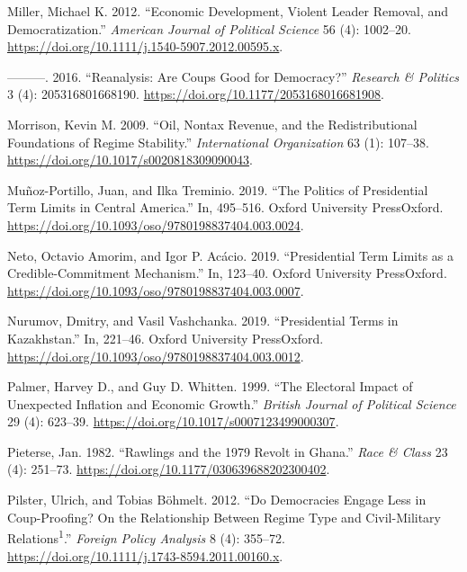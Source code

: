 \documentclass[
  12pt,
]{report}
\newlength{\cslhangindent}
\newenvironment{CSLReferences}[2] %
 {\begin{list}{}{%
  \setlength{\itemindent}{0pt}
  \setlength{\leftmargin}{0pt}
  \setlength{\parsep}{0pt}
  \ifodd #1
   \setlength{\leftmargin}{\cslhangindent}
   \setlength{\itemindent}{-1\cslhangindent}
  \fi
  \setlength{\itemsep}{#2\baselineskip}}}
 {\end{list}}
\begin{document}
\begin{CSLReferences}{1}{0}
Miller, Michael K. 2012. {``Economic Development, Violent Leader
Removal, and Democratization.''} \emph{American Journal of Political
Science} 56 (4): 1002--20.
\url{https://doi.org/10.1111/j.1540-5907.2012.00595.x}.

---------. 2016. {``Reanalysis: Are Coups Good for Democracy?''}
\emph{Research \& Politics} 3 (4): 205316801668190.
\url{https://doi.org/10.1177/2053168016681908}.

Morrison, Kevin M. 2009. {``Oil, Nontax Revenue, and the
Redistributional Foundations of Regime Stability.''} \emph{International
Organization} 63 (1): 107--38.
\url{https://doi.org/10.1017/s0020818309090043}.

Muñoz-Portillo, Juan, and Ilka Treminio. 2019. {``The Politics of
Presidential Term Limits in Central America.''} In, 495--516. Oxford
University PressOxford.
\url{https://doi.org/10.1093/oso/9780198837404.003.0024}.

Neto, Octavio Amorim, and Igor P. Acácio. 2019. {``Presidential Term
Limits as a Credible-Commitment Mechanism.''} In, 123--40. Oxford
University PressOxford.
\url{https://doi.org/10.1093/oso/9780198837404.003.0007}.

Nurumov, Dmitry, and Vasil Vashchanka. 2019. {``Presidential Terms in
Kazakhstan.''} In, 221--46. Oxford University PressOxford.
\url{https://doi.org/10.1093/oso/9780198837404.003.0012}.

Palmer, Harvey D., and Guy D. Whitten. 1999. {``The Electoral Impact of
Unexpected Inflation and Economic Growth.''} \emph{British Journal of
Political Science} 29 (4): 623--39.
\url{https://doi.org/10.1017/s0007123499000307}.

Pieterse, Jan. 1982. {``Rawlings and the 1979 Revolt in Ghana.''}
\emph{Race \& Class} 23 (4): 251--73.
\url{https://doi.org/10.1177/030639688202300402}.

Pilster, Ulrich, and Tobias Böhmelt. 2012. {``Do Democracies Engage Less
in Coup-Proofing? On the Relationship Between Regime Type and
Civil-Military Relations{\textsuperscript{1}}.''} \emph{Foreign Policy
Analysis} 8 (4): 355--72.
\url{https://doi.org/10.1111/j.1743-8594.2011.00160.x}.


\end{CSLReferences}
\end{document}
